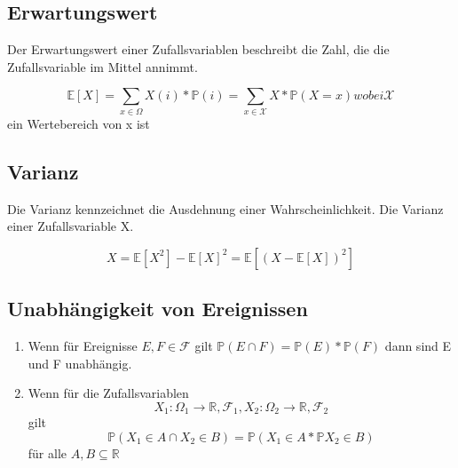 \subsection *{Erwartungswert}

\vspace{5pt}

 Der Erwartungswert einer Zufallsvariablen beschreibt die Zahl, die die Zufallsvariable im Mittel annimmt.

\vspace{3pt}

\begin{equation*}
\mathds{E} [X] = \sum_{x \in \Omega} X (i) * \mathds{P} ({i}) = \sum_{x\in\mathcal{X}} X* \mathds{P} (X=x) wobei \mathcal{X}
\end{equation*}
  ein Wertebereich von x ist  

\vspace{10pt}

\subsection *{Varianz}

\vspace{5pt}

Die Varianz kennzeichnet die Ausdehnung einer Wahrscheinlichkeit. Die Varianz einer Zufallsvariable X.

\vspace{3pt}

\begin{equation*}
X= \mathds{E} [X^2] - \mathds{E} [X]^2 = \mathds{E} [ (X - \mathds{E} [X] )^2 ] 
\end{equation*}

\vspace{10pt}

\subsection *{Unabh\"angigkeit von Ereignissen}

\vspace{5pt}

\begin{enumerate}
	\item Wenn f\"ur Ereignisse $E, F \in \mathcal{F} $ gilt
	\vspace{3pt}
	$\mathds{P} (E\cap F)= \mathds{P} (E) * \mathds{P} (F)$
	\vspace{3pt}
dann sind E und F unabh\"angig. 

\item Wenn f\"ur die Zufallsvariablen 
\begin{equation*}
X_{1}: \Omega_{1} \longrightarrow \mathds{R}, \mathcal{F}_{1} , X_{2}: \Omega_{2} \longrightarrow \mathds{R}, \mathcal{F}_{2}
\end{equation*}
 gilt
\vspace{3pt}
\begin{equation*}
\mathds{P} ({X_{1} \in A} \cap {X_{2} \in B} ) = \mathds{P} ({X_{1} \in A} * \mathds{P} {X_{2} \in B} )
\end{equation*}
\vspace{3pt}
f\"ur alle $A, B \subseteq \mathds{R}$
\end{enumerate}

